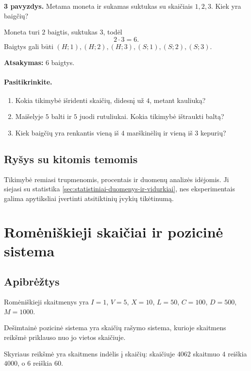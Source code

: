 \textbf{3 pavyzdys.} Metama moneta ir sukamas suktukas su skaičiais \(1,2,3\). Kiek yra baigčių?

Moneta turi \(2\) baigtis, suktukas \(3\), todėl
\[
2\cdot 3=6.
\]
Baigtys gali būti \((H;1),(H;2),(H;3),(S;1),(S;2),(S;3)\).

\textbf{Atsakymas:} \(6\) baigtys.

\paragraph{Pasitikrinkite.}
\begin{enumerate}[label=\arabic*.]
\item Kokia tikimybė išridenti skaičių, didesnį už \(4\), metant kauliuką?
\item Maišelyje \(5\) balti ir \(5\) juodi rutuliukai. Kokia tikimybė ištraukti baltą?
\item Kiek baigčių yra renkantis vieną iš \(4\) marškinėlių ir vieną iš \(3\) kepurių?
\end{enumerate}

\subsection{Ryšys su kitomis temomis}
Tikimybė remiasi trupmenomis, procentais ir duomenų analizės idėjomis. Ji siejasi su statistika \ref{sec:statistiniai-duomenys-ir-vidurkiai}, nes eksperimentais galima apytiksliai įvertinti atsitiktinių įvykių tikėtinumą.

\section{Romėniškieji skaičiai ir pozicinė sistema}\label{sec:romeniskieji-skaiciai-ir-pozicine-sistema}

\subsection{Apibrėžtys}
\begin{apibreztis}
Romėniškieji skaitmenys yra \(I=1\), \(V=5\), \(X=10\), \(L=50\), \(C=100\), \(D=500\), \(M=1000\).
\end{apibreztis}
\begin{apibreztis}
Dešimtainė pozicinė sistema yra skaičių rašymo sistema, kurioje skaitmens reikšmė priklauso nuo jo vietos skaičiuje.
\end{apibreztis}
\begin{apibreztis}
Skyriaus reikšmė yra skaitmens indėlis į skaičių: skaičiuje \(4062\) skaitmuo \(4\) reiškia \(4000\), o \(6\) reiškia \(60\).
\end{apibreztis}

